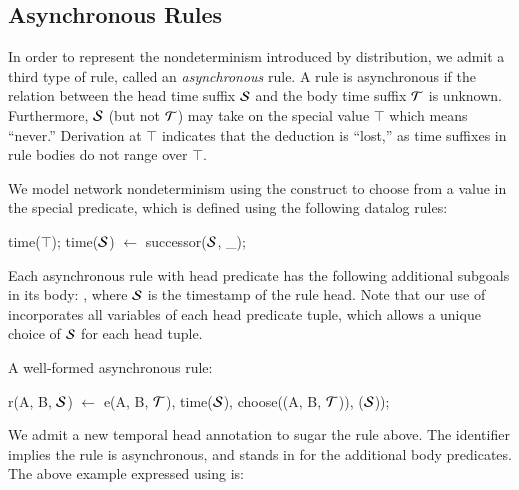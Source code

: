 \subsection{Asynchronous Rules}

In order to represent the nondeterminism introduced by distribution, we admit a
third type of rule, called an {\em asynchronous} rule.  A rule is asynchronous
if the 
relation between the head time suffix $\SDedalus$ and the body time suffix $\Tau$ is
unknown.  Furthermore, $\SDedalus$ (but not $\Tau$) may take on the special value
$\top$ which means ``never.''  Derivation at $\top$ indicates that the
deduction is ``lost,'' as time suffixes in rule bodies do not range over
$\top$.

We model network nondeterminism using the  construct to choose
from a value in the special 
predicate, which is defined using the following datalog rules:

\begin{Dedalus}
time(\(\top\));
time(\(\SDedalus\)) \(\leftarrow\) successor(\(\SDedalus\), _);
\end{Dedalus}

\noindent
Each asynchronous rule with head predicate  has the following additional subgoals in its
body: , where
$\SDedalus$ is the timestamp of the rule head.  Note that our use of  incorporates all variables of each head predicate tuple, which allows a unique choice of $\SDedalus$ for each head tuple.


\begin{example}
A well-formed asynchronous \lang rule:

\begin{Dedalus}
r(A, B, \(\SDedalus\)) \(\leftarrow\) 
  e(A, B, \(\Tau\)),
  time(\(\SDedalus\)), choose((A, B, \(\Tau\))), (\(\SDedalus\)));
\end{Dedalus}
\end{example}

We admit a new temporal head annotation to sugar the rule above.  The
identifier  implies the rule is asynchronous, and stands in for
the additional body predicates.
The above example expressed using  is:

